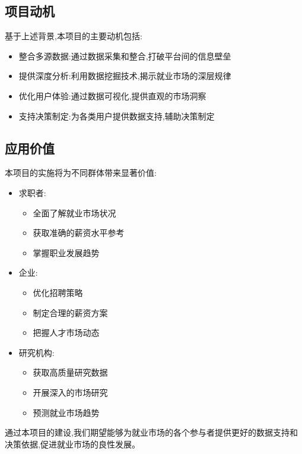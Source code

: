 \subsection{项目动机}

基于上述背景,本项目的主要动机包括:

\begin{itemize}
    \item 整合多源数据:通过数据采集和整合,打破平台间的信息壁垒
    \item 提供深度分析:利用数据挖掘技术,揭示就业市场的深层规律
    \item 优化用户体验:通过数据可视化,提供直观的市场洞察
    \item 支持决策制定:为各类用户提供数据支持,辅助决策制定
\end{itemize}

\subsection{应用价值}

本项目的实施将为不同群体带来显著价值:

\begin{itemize}
    \item 求职者:
    \begin{itemize}
        \item 全面了解就业市场状况
        \item 获取准确的薪资水平参考
        \item 掌握职业发展趋势
    \end{itemize}
    
    \item 企业:
    \begin{itemize}
        \item 优化招聘策略
        \item 制定合理的薪资方案
        \item 把握人才市场动态
    \end{itemize}
    
    \item 研究机构:
    \begin{itemize}
        \item 获取高质量研究数据
        \item 开展深入的市场研究
        \item 预测就业市场趋势
    \end{itemize}
\end{itemize}

通过本项目的建设,我们期望能够为就业市场的各个参与者提供更好的数据支持和决策依据,促进就业市场的良性发展。